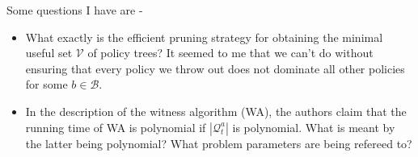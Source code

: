 \documentclass{article}
\begin{document}
Some questions I have are - 
\begin{itemize}
	\item What exactly is the efficient pruning strategy for obtaining the minimal useful set $\mathcal{V}$ of policy trees? It seemed to me that we can't do without ensuring that every policy we throw out does not dominate all other policies for some $b \in \mathcal{B}$.
	\item In the description of the witness algorithm (WA), the authors claim that the running time of WA is polynomial if $|\mathcal{Q}_t^{a}|$ is polynomial. What is meant by the latter being polynomial? What problem parameters are being refereed to?
\end{itemize}
\end{document}
